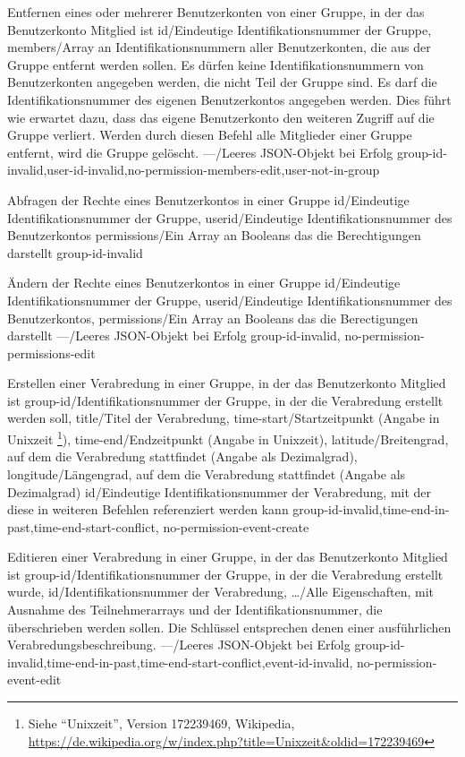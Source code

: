 \documentclass[parskip=full,11pt]{scrartcl}
\begin{document}
{Entfernen eines oder mehrerer Benutzerkonten von einer Gruppe, in der das
Benutzerkonto Mitglied ist}
{id/Eindeutige Identifikationsnummer der Gruppe,
members/Array an Identifikationsnummern aller Benutzerkonten{,} die aus der
Gruppe entfernt werden sollen.
Es dürfen keine Identifikationsnummern von Benutzerkonten angegeben werden{,}
die nicht Teil der Gruppe sind.
Es darf die Identifikationsnummer des eigenen Benutzerkontos angegeben werden.
Dies führt wie erwartet dazu{,} dass das eigene Benutzerkonto den weiteren
Zugriff auf die Gruppe verliert.
Werden durch diesen Befehl alle Mitglieder einer Gruppe entfernt{,} wird die
Gruppe gelöscht.}
{---/Leeres JSON-Objekt bei Erfolg}
{group-id-invalid,user-id-invalid,no-permission-members-edit,user-not-in-group}

{Abfragen der Rechte eines Benutzerkontos in einer Gruppe}
{id/Eindeutige Identifikationsnummer der Gruppe,
userid/Eindeutige Identifikationsnummer des Benutzerkontos}
{permissions/Ein Array an Booleans das die Berechtigungen darstellt}
{group-id-invalid}

{Ändern der Rechte eines Benutzerkontos in einer Gruppe}
{id/Eindeutige Identifikationsnummer der Gruppe,
userid/Eindeutige Identifikationsnummer des Benutzerkontos,
permissions/Ein Array an Booleans das die Berectigungen darstellt}
{---/Leeres JSON-Objekt bei Erfolg}
{group-id-invalid, no-permission-permissions-edit}

{Erstellen einer Verabredung in einer Gruppe, in der das Benutzerkonto Mitglied
ist}
{group-id/Identifikationsnummer der Gruppe{,} in der die Verabredung erstellt
werden soll,
title/Titel der Verabredung,
time-start/Startzeitpunkt (Angabe in Unixzeit%
\footnote{Siehe \enquote{Unixzeit}, Version 172239469, Wikipedia,\\
\url{https://de.wikipedia.org/w/index.php?title=Unixzeit&oldid=172239469}}),
time-end/Endzeitpunkt (Angabe in Unixzeit),
latitude/Breitengrad{,} auf dem die Verabredung stattfindet (Angabe als
Dezimalgrad),
longitude/Längengrad{,} auf dem die Verabredung stattfindet (Angabe als
Dezimalgrad)}
{id/Eindeutige Identifikationsnummer der Verabredung{,} mit der diese in
weiteren Befehlen referenziert werden kann}
{group-id-invalid,time-end-in-past,time-end-start-conflict,
no-permission-event-create}

{Editieren einer Verabredung in einer Gruppe, in der das Benutzerkonto Mitglied
ist}
{group-id/Identifikationsnummer der Gruppe{,} in der die Verabredung erstellt
wurde,
id/Identifikationsnummer der Verabredung,
\dots/Alle Eigenschaften{,} mit Ausnahme des Teilnehmerarrays und der
Identifikationsnummer{,} die überschrieben werden sollen.
Die Schlüssel entsprechen denen einer ausführlichen Verabredungsbeschreibung.}
{---/Leeres JSON-Objekt bei Erfolg}
{group-id-invalid,time-end-in-past,time-end-start-conflict,event-id-invalid,
no-permission-event-edit}
\end{document}
